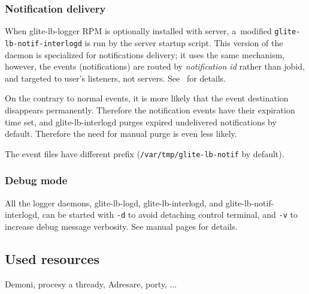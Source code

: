 \subsubsection{Notification delivery}
\begin{sloppypar}
When glite-lb-logger RPM is optionally installed with \LB server, 
a~modified \verb'glite-lb-notif-interlogd' is run by the server startup
script.
This version of the daemon is specialized for \LB notifications delivery;
it uses the same mechanism, however, the events (notifications) are routed
by \emph{notification id} rather than jobid, and targeted to user's listeners,
not \LB servers.
See~\cite{lbug, lbdg} for details.
\end{sloppypar}

On the contrary to normal events, it is more likely that the event destination
disappears permanently.
Therefore the notification events have their expiration time set,
and glite-lb-interlogd purges expired undelivered notifications by default.
Therefore the need for manual purge is even less likely.

The event files have different prefix (\verb'/var/tmp/glite-lb-notif' by default).

\subsubsection{Debug mode}

All the logger daemons, \ie glite-lb-logd, glite-lb-interlogd, and
glite-lb-notif-interlogd, can be started with \verb'-d' 
to avoid detaching control terminal, and \verb'-v' to increase 
debug message verbosity.
See manual pages for details.

\subsection{Used resources}

Demoni, procesy a thready, Adresare, porty, ...
